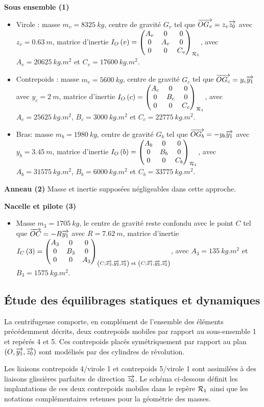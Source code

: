 \documentclass[10pt,fleqn]{article} %
\begin{document}
\begin{multicols}{2}
\textbf{Sous ensemble (1)}
\begin{itemize}
\item Virole : masse $m_v=\SI{8325}{kg}$, centre de gravité 
$G_v$ tel que $\vect{OG_v}=z_v\vect{z_0}$ avec $z_v=\SI{0,63}{m}$, matrice d'inertie $\inertie{O}{v}=\matinertie{A_v}{A_v}{C_v}{0}{0}{0}{\rep{1}}$, avec $A_v=\SI{20625}{kg.m^2}$ et $C_v=\SI{17600}{kg.m^2}$.
\item Contrepoids : masse $m_c=\SI{5600}{kg}$, centre de gravité 
$G_c$ tel que $\vect{OG_c}=y_c\vect{y_1}$ avec $y_c=\SI{2}{m}$, matrice d'inertie $\inertie{O}{c}=\matinertie{A_c}{B_c}{C_c}{0}{0}{0}{\rep{1}}$, avec $A_c=\SI{25625}{kg.m^2}$, $B_c=\SI{3000}{kg.m^2}$ et $C_c=\SI{22775}{kg.m^2}$.
\item Bras: masse $m_b=\SI{1980}{kg}$, centre de gravité 
$G_b$ tel que $\vect{OG_b}=-y_b\vect{y_1}$ avec $y_b=\SI{3,45}{m}$, matrice d'inertie $\inertie{O}{b}=\matinertie{A_b}{B_b}{C_b}{0}{0}{0}{\rep{1}}$, avec $A_b=\SI{31575}{kg.m^2}$, $B_b=\SI{6000}{kg.m^2}$ et $C_b=\SI{33775}{kg.m^2}$.
\end{itemize}

\textbf{Anneau (2)}
Masse et inertie supposées négligeables dans cette approche.


\textbf{Nacelle et pilote (3)}
\begin{itemize}
\item Masse $m_3=\SI{1705}{kg}$, le centre de gravité  reste confondu avec le point $C$ tel que $\vect{OC}=-R\vect{y_1}$ avec ${R}=\SI{7,62}{m}$, matrice d'inertie $\inertie{C}{3}=\matinertie{A_3}{B_3}{A_3}{0}{0}{0}{\repere{C}{x_3}{y_2}{z_3}\text{ et } \repere{C}{x_1}{y_2}{z_2}}$, avec $A_3=\SI{135}{kg.m^2}$ et $B_3=\SI{1575}{kg.m^2}$.
\end{itemize}


\subsection*{Étude des équilibrages statiques et dynamiques}
La centrifugeuse comporte, en complément de l’ensemble des éléments précédemment décrits, deux
contrepoids mobiles par rapport au sous-ensemble 1 et repérés 4 et 5. Ces contrepoids placés symétriquement
par rapport au plan $\left( O,\vect{y_1},\vect{z_0}\right)$ sont modélisés par des cylindres de révolution.

Les liaisons contrepoids 4/virole 1 et contrepoids 5/virole 1 sont assimilées à des liaisons glissières parfaites
de direction $\vect{z_0}$. Le schéma ci-dessous définit les implantations de ces deux contrepoids mobiles dans le repère
$\rep{1}$ ainsi que les notations complémentaires retenues pour la géométrie des masses.


\end{multicols}
\end{document}
